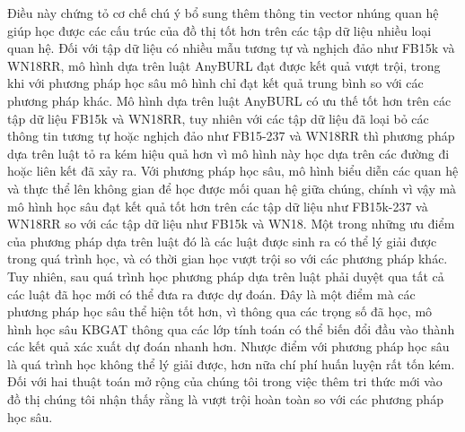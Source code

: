Điều này chứng tỏ cơ chế chú ý bổ sung thêm thông tin vector nhúng quan hệ giúp học được các cấu trúc của đồ thị tốt hơn trên các tập dữ liệu nhiều loại quan hệ.
Đối với tập dữ liệu có nhiều mẫu tương tự và nghịch đảo như FB15k và WN18RR, mô hình dựa trên luật AnyBURL đạt được kết quả vượt trội, trong khi với phương pháp học sâu mô hình chỉ đạt kết quả trung bình so với các phương pháp khác.
Mô hình dựa trên luật AnyBURL có ưu thế tốt hơn trên các tập dữ liệu FB15k và WN18RR, tuy nhiên với các tập dữ liệu đã loại bỏ các thông tin tương tự hoặc nghịch đảo như FB15-237 và WN18RR thì phương pháp dựa trên luật tỏ ra kém hiệu quả hơn vì mô hình này học dựa trên các đường đi hoặc liên kết đã xảy ra. Với phương pháp học sâu, mô hình biểu diễn các quan hệ và thực thể lên không gian để học được mối quan hệ giữa chúng, chính vì vậy mà mô hình học sâu đạt kết quả tốt hơn trên các tập dữ liệu như FB15k-237 và WN18RR so với các tập dữ liệu như FB15k và WN18.
Một trong những ưu điểm của phương pháp dựa trên luật đó là các luật được sinh ra có thể lý giải được trong quá trình học, và có thời gian học vượt trội so với các phương pháp khác. Tuy nhiên, sau quá trình học phương pháp dựa trên luật phải duyệt qua tất cả các luật đã học mới có thể đưa ra được dự đoán. Đây là một điểm mà các phương pháp học sâu thể hiện tốt hơn, vì thông qua các trọng số đã học, mô hình học sâu KBGAT thông qua các lớp tính toán có thể biến đổi đầu vào thành các kết quả xác xuất dự đoán nhanh hơn. Nhược điểm với phương pháp học sâu là quá trình học không thể lý giải được, hơn nữa chí phí huấn luyện rất tốn kém. Đối với hai thuật toán mở rộng của chúng tôi trong việc thêm tri thức mới vào đồ thị chúng tôi nhận thấy rằng là vượt trội hoàn toàn so với các phương pháp học sâu.

